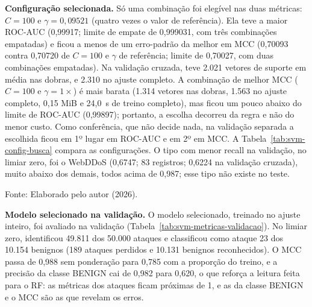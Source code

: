 \documentclass[
    12pt,                %
    openright,           %
    oneside,             %
    a4paper,             %
    english,             %
    brazil               %
]{abntex2}
\begin{document}
\textbf{Configuração selecionada.} Só uma combinação foi elegível nas duas métricas: $C = 100$ e $\gamma = 0{,}09521$ (quatro vezes o valor de referência). Ela teve a maior ROC-AUC (0,99917; limite de empate de 0,999031, com três combinações empatadas) e ficou a menos de um erro-padrão da melhor em MCC (0,70093 contra 0,70720 de $C = 100$ e $\gamma$ de referência; limite de 0,70027, com duas combinações empatadas). Na validação cruzada, teve 2.021 vetores de suporte em média nas dobras, e 2.310 no ajuste completo. A combinação de melhor MCC ($C = 100$ e $\gamma = 1\times$) é mais barata (1.314 vetores nas dobras, 1.563 no ajuste completo, 0,15 MiB e 24,0~s de treino completo), mas ficou um pouco abaixo do limite de ROC-AUC (0,99897); portanto, a escolha decorreu da regra e não do menor custo. Como conferência, que não decide nada, na validação separada a escolhida ficou em 1º lugar em ROC-AUC e em 2º em MCC. A Tabela~\ref{tab:svm-config-busca} compara as configurações. O tipo com menor recall na validação, no limiar zero, foi o WebDDoS (0,6747; 83 registros; 0,6224 na validação cruzada), muito abaixo dos demais, todos acima de 0,987; esse tipo não existe no teste.

\begin{table}
\centering
\caption{Configurações do SVM comparadas na busca}
\label{tab:svm-config-busca}
\footnotesize
{}
\par\smallskip
Fonte: Elaborado pelo autor (2026).
\end{table}

\textbf{Modelo selecionado na validação.} O modelo selecionado, treinado no ajuste inteiro, foi avaliado na validação (Tabela~\ref{tab:svm-metricas-validacao}). No limiar zero, identificou 49.811 dos 50.000 ataques e classificou como ataque 23 dos 10.154 benignos (189 ataques perdidos e 10.131 benignos reconhecidos). O MCC passa de 0,988 sem ponderação para 0,785 com a proporção do treino, e a precisão da classe BENIGN cai de 0,982 para 0,620, o que reforça a leitura feita para o RF: as métricas dos ataques ficam próximas de 1, e as da classe BENIGN e o MCC são as que revelam os erros.
\end{document}
